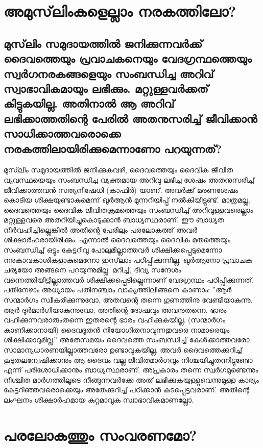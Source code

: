  \chapter{അമുസ്‌ലിംകളെല്ലാം നരകത്തിലോ? }
 \section{ മുസ്‌ലിം സമുദായത്തില്‍ ജനിക്കുന്നവര്‍ക്ക് ദൈവത്തെയും പ്രവാചകനെയും വേദഗ്രന്ഥത്തെയും സ്വര്‍ഗനരകങ്ങളെയും സംബന്ധിച്ച അറിവ് സ്വാഭാവികമായും ലഭിക്കും. മറ്റുള്ളവര്‍ക്കത് കിട്ടുകയില്ല. അതിനാല്‍ ആ അറിവ് ലഭിക്കാത്തതിന്റെ പേരില്‍ അതനുസരിച്ച് ജീവിക്കാന്‍ സാധിക്കാത്തവരൊക്കെ നരകത്തിലായിരിക്കുമെന്നാണോ പറയുന്നത്?}
 മുസ്‌ലിം സമുദായത്തില്‍ ജനിക്കുകവഴി, ദൈവത്തെയും ദൈവിക ജീവിത വ്യവസ്ഥയെയും സംബന്ധിച്ച വ്യക്തമായ അറിവു ലഭിച്ച ശേഷം അതനുസരിച്ച് ജീവിക്കാത്തവന്‍ സത്യനിഷേധി (കാഫിര്‍) യാണ്. അവര്‍ക്ക് മരണശേഷം കൊടിയ ശിക്ഷയുണ്ടാകുമെന്ന് ഖുര്‍ആന്‍ മുന്നറിയിപ്പ് നല്‍കിയിട്ടുണ്ട്. മാത്രമല്ല, ദൈവത്തെയും ദൈവിക ജീവിതക്രമത്തെയും സംബന്ധിച്ച് അറിവുള്ളവരെല്ലാം മറ്റുള്ളവരെ അതറിയിച്ചുകൊടുക്കാന്‍ ബാധ്യസ്ഥരാണ്. ഈ ബാധ്യത നിര്‍വഹിച്ചില്ലെങ്കില്‍ അതിന്റെ പേരിലും പരലോകത്ത് അവര്‍ ശിക്ഷാര്‍ഹരായിരിക്കും.
എന്നാല്‍ ദൈവത്തെയും ദൈവിക മതത്തെയും സംബന്ധിച്ച് ഒട്ടും കേട്ടറിവു പോലുമില്ലാത്തവര്‍ ശിക്ഷിക്കപ്പെടുമെന്നോ നരകാവകാശികളാകുമെന്നോ ഇസ്‌ലാം പഠിപ്പിക്കുന്നില്ല. ഖുര്‍ആനോ പ്രവാചക ചര്യയോ അങ്ങനെ പറയുന്നുമില്ല. മറിച്ച്, ദിവ്യ സന്ദേശം വന്നെത്തിയിട്ടില്ലാത്തവര്‍ ശിക്ഷിക്കപ്പെടില്ലെന്നാണ് വേദഗ്രന്ഥം പഠിപ്പിക്കുന്നത്. പതിനേഴാം അധ്യായം പതിനഞ്ചാം വാക്യത്തിലിങ്ങനെ കാണാം: ''ആര്‍ സന്മാര്‍ഗം സ്വീകരിക്കുന്നുവോ, അതവന്റെ തന്നെ ഗുണത്തിനു വേണ്ടിയാകുന്നു. ആര്‍ ദുര്‍മാര്‍ഗിയാകുന്നുവോ, അതിന്റെ ദോഷവും അവനുതന്നെ. ഭാരം വഹിക്കുന്നവരാരുംതന്നെ ഇതരന്റെ ഭാരം വഹിക്കുകയില്ല. (സന്മാര്‍ഗം കാണിക്കാനായി) ദൈവദൂതന്‍ നിയോഗിതനാവുന്നതുവരെ നാമാരെയും ശിക്ഷിക്കാറുമില്ല.''
അതേസമയം ദൈവത്തെ സംബന്ധിച്ച് കേള്‍ക്കാത്തവരോ സാമാന്യധാരണയില്ലാത്തവരോ ഉണ്ടാവുകയില്ല. അവര്‍ ദൈവത്തെക്കുറിച്ച് കൂടുതലന്വേഷിക്കാനും ആ ദൈവം വല്ല ജീവിതമാര്‍ഗവും നിശ്ചയിച്ചുതന്നിട്ടുണ്ടോ എന്ന് പരിശോധിക്കാനും ബാധ്യസ്ഥരാണ്. അപ്രകാരം തന്നെ സ്വര്‍ഗമുണ്ടെന്നും നിശ്ചിത മാര്‍ഗത്തിലൂടെ നീങ്ങുന്നവര്‍ക്കേ അത് ലഭിക്കുകയുള്ളൂവെന്നുമുള്ള കാര്യം കേട്ടറിഞ്ഞവരൊക്കെയും അതേക്കുറിച്ച് പഠിക്കാന്‍ കടപ്പെട്ടവരാണ്. അതിന്റെ ലംഘനം ശിക്ഷാര്‍ഹമായ കുറ്റമാവുക സ്വാഭാവികമാണല്ലോ.
\chapter{പരലോകത്തും സംവരണമോ? }
